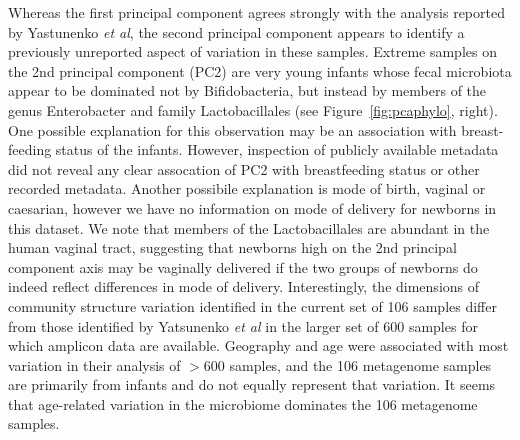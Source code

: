 \documentclass[10pt]{article}
\begin{document}
Whereas the first principal component agrees strongly with the analysis reported by Yastunenko \textit{et al}, the second principal component appears to identify a previously unreported aspect of variation in these samples.
Extreme samples on the 2nd principal component (PC2) are very young infants whose fecal microbiota appear to be dominated not by Bifidobacteria, but instead by members of the genus Enterobacter and family Lactobacillales (see Figure~\ref{fig:pcaphylo}, right).
One possible explanation for this observation may be an association with breast-feeding status of the infants.
However, inspection of publicly available metadata did not reveal any clear assocation of PC2 with breastfeeding status or other recorded metadata.
Another possibile explanation is mode of birth, vaginal or caesarian, however we have no information on mode of delivery for newborns in this dataset.
We note that members of the Lactobacillales are abundant in the human vaginal tract, suggesting that newborns high on the 2nd principal component axis may be vaginally delivered if the two groups of newborns do indeed reflect differences in mode of delivery.
Interestingly, the dimensions of community structure variation identified in the current set of 106 samples differ from those identified by Yatsunenko \textit{et al} in the larger set of 600 samples for which amplicon data are available.
Geography and age were associated with most variation in their analysis of $>$600 samples, and the 106 metagenome samples are primarily from infants and do not equally represent that variation.
It seems that age-related variation in the microbiome dominates the 106 metagenome samples.
\end{document}
